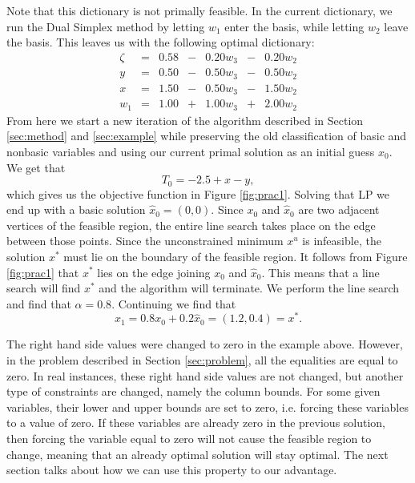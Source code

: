 Note that this dictionary is not primally feasible. 
In the current dictionary, we run the Dual Simplex method by letting $w_1$
enter the basis, while letting $w_2$ leave the basis.
This leaves us with the following optimal dictionary:
\[
    \begin{array}{rcrcrcr}
        \zeta &=& 0.58 &-& 0.20 w_3 &-& 0.20 w_2 \\ \hline
            y &=& 0.50 &-& 0.50 w_3 &-& 0.50 w_2 \\
            x &=& 1.50 &-& 0.50 w_3 &-& 1.50 w_2 \\
          w_1 &=& 1.00 &+& 1.00 w_3 &+& 2.00 w_2
    \end{array}
\]
From here we start a new iteration of the algorithm described in Section
\ref{sec:method} and \ref{sec:example} while preserving the old classification
of basic and nonbasic variables and using our current primal solution as an
initial guess $x_0$. We get that
\[
    T_0 = -2.5 + x - y,
\]
which gives us the objective function in Figure \ref{fig:prac1}. Solving that
LP we end up with a basic solution $\hat{x}_0 = (0,0)$. Since $x_0$ and
$\hat{x}_0$ are two adjacent vertices of the feasible region, the entire line
search takes place on the edge between those points.
Since the unconstrained minimum $x^u$ is infeasible, the solution $x^*$ must
lie on the boundary of the feasible region.
It follows from Figure \ref{fig:prac1} that $x^*$ lies on the edge joining 
$x_0$ and $\hat{x}_0$.
This means that a line search will find $x^*$ and the algorithm will terminate.
We perform the line search and find that $\alpha = 0.8$.
Continuing we find that
\[
    x_1 = 0.8 x_0 + 0.2 \hat{x}_0 = (1.2, 0.4) = x^*.
\]

The right hand side values were changed to zero in the example above. However,
in the problem described in Section \ref{sec:problem}, all the equalities are
equal to zero. In real instances, these right hand side values are not changed,
but another type of constraints are changed, namely the column bounds. For some
given variables, their lower and upper bounds are set to zero, i.e. forcing
these variables to a value of zero. If these variables are already zero in the
previous solution, then forcing the variable equal to zero will not cause the
feasible region to change, meaning that an already optimal solution will stay
optimal. The next section talks about how we can use this property to our
advantage.
